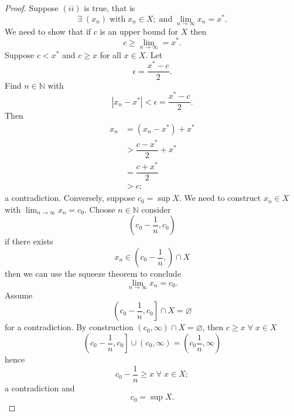\begin{proof}
    Suppose $(ii)$ is true, that is \[\exists\;(x_n)\;\text{with}\;x_n\in X;\;\text{and}\;\lim_{n\to\infty}x_n=x^*.\] We need to show that if $c$ is an upper bound for $X$ then \[c\geq\lim_{n\to\infty}=x^*.\] Suppose $c<x^*$ and $c\geq x$ for all $x\in X$. Let \[\epsilon=\dfrac{x^*-c}{2}.\] Find $n\in\mathbb N$ with \[|x_n-x^*|<\epsilon=\dfrac{x^*-c}{2}.\] Then
    \begin{align*}
        x_n&=(x_n-x^*)+x^*\\
        &>\dfrac{c-x^*}{2}+x^*\\
        &=\dfrac{c+x^*}{2}\\
        &>c;
    \end{align*}
    a contradiction. Conversely, suppose $c_0=\sup{X}$. We need to construct $x_n\in X$ with $\lim_{n\to\infty}x_n=c_0$. Choose $n\in\mathbb N$ consider \[\left(c_0-\frac1n,c_0\right)\] if there exists \[x_n\in\left(c_0-\frac1n,\right)\cap X\] then we can use the squeeze theorem to conclude \[\lim_{n\to\infty}x_n=c_0.\] Assume \[\left(c_0-\frac1n,c_0\right]\cap X=\varnothing\] for a contradiction. By construction $(c_0,\infty)\cap X=\varnothing$, then $c\geq x\;\forall\;x\in X$ \[\left(c_0-\frac1n,c_0\right]\cup(c_0,\infty)=(c_0\frac1n,\infty)\] hence \[c_0-\frac1n\geq x\;\forall\;x\in X;\] a contradiction and \[c_0=\sup{X}.\]
\end{proof}

